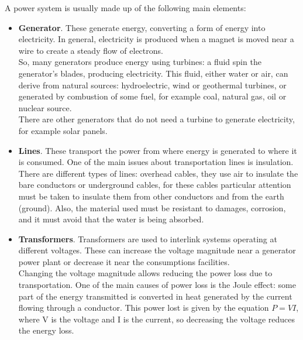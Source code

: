 \noindent A power system is usually made up of the following main elements: \label{networkeledesc}
\begin{itemize}
    \item \textbf{Generator}. These generate energy, converting a form of energy into electricity. In general, electricity is produced when a magnet is moved near a wire to create a steady flow of electrons.\\
    So, many generators produce energy using turbines: a fluid spin the generator's blades, producing electricity. This fluid, either water or air, can derive from natural sources: hydroelectric, wind or geothermal turbines, or generated by combustion of some fuel, for example coal, natural gas, oil or nuclear source. \\
    There are other generators that do not need a turbine to generate electricity, for example solar panels.
    
    \item \textbf{Lines}. These transport the power from where energy is generated to where it is consumed. One of the main issues about transportation lines is insulation. \\
    There are different types of lines: overhead cables, they use air to insulate the bare conductors or underground cables, for these cables particular attention must be taken to insulate them from other conductors and from the earth (ground). Also, the material used must be resistant to damages, corrosion, and it must avoid that the water is being absorbed.
    
    \item \textbf{Transformers}. Transformers are used to interlink systems operating at different voltages. These can increase  the voltage magnitude near a generator power plant or decrease it near the consumptions facilities. \\
    Changing the voltage magnitude allows reducing the power loss due to transportation. One of the main causes of power loss is the Joule effect: some part of the energy transmitted is converted in heat generated by the current flowing through a conductor. This power lost is given by the equation $P=VI$, where \gls{V} is the voltage and \gls{I} is the current, so decreasing the voltage reduces the energy loss.
    

\end{itemize}
